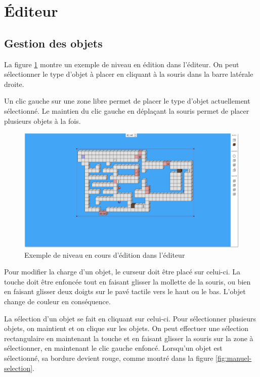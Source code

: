 \section{Éditeur}

\subsection{Gestion des objets}

La figure \ref{fig:manuel-editeur-example} montre un exemple de niveau
en édition dans l'éditeur. On peut sélectionner le type d'objet à placer
en cliquant à la souris dans la barre latérale droite.

Un clic gauche sur une zone libre permet de placer le type d'objet
actuellement sélectionné. Le maintien du clic gauche en déplaçant la
souris permet de placer plusieurs objets à la fois.

\begin{figure}[h]
    \centering
    \includegraphics[width=13cm]{figures/manuel-editor.png}
    \caption{Exemple de niveau en cours d'édition dans l'éditeur}
    \label{fig:manuel-editeur-example}
\end{figure}

Pour modifier la charge d'un objet, le curseur doit être placé sur
celui-ci. La touche  doit être enfoncée tout en faisant
glisser la mollette de la souris, ou bien en faisant glisser deux
doigts sur le pavé tactile vers le haut ou le bas. L'objet change
de couleur en conséquence.

La sélection d'un objet se fait en cliquant sur celui-ci. Pour sélectionner
plusieurs objets, on maintient  et on clique sur les objets.
On peut effectuer une sélection rectangulaire en maintenant la touche
 et en faisant glisser la souris sur la zone à sélectionner,
en maintenant le clic gauche enfoncé. Lorsqu'un objet est sélectionné, sa
bordure devient rouge, comme montré dans la figure \ref{fig:manuel-selection}.

